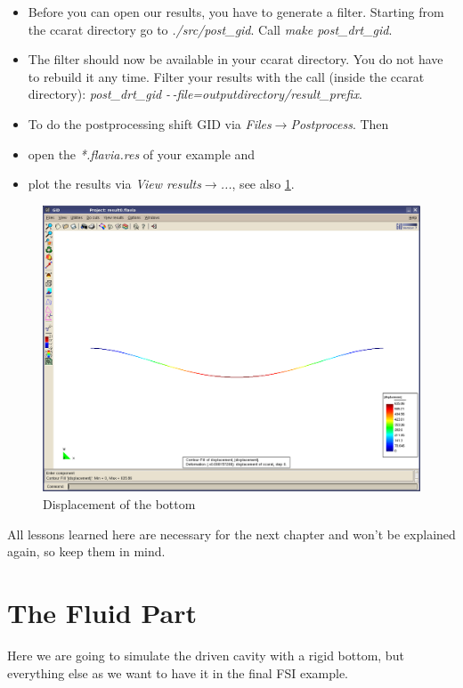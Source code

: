 \begin{itemize}
\item Before you can open our results, you have to generate a filter. Starting from the ccarat directory go to \emph{./src/post\_gid}. Call \emph{make post\_drt\_gid}.
\item The filter should now be available in your ccarat directory. You do not have to rebuild it any time. Filter your results with the call (inside the ccarat directory): \emph{post\_drt\_gid -\,-file=outputdirectory/result\_prefix}.
\item To do the postprocessing shift GID via \emph{Files$\to$Postprocess}.
Then
\item open the \emph{{*}.flavia.res} of your example and
\item plot the results via \emph{View results$\to$...}, see also \ref{tut_fsi:3.3}.
\end{itemize}
%
\begin{figure}[h]
\includegraphics[width=1\columnwidth]{Bilder/structure_03}


\caption{\label{tut_fsi:3.3} Displacement of the bottom}
\end{figure}


All lessons learned here are necessary for the next chapter and won't
be explained again, so keep them in mind.


\section{The Fluid Part}

Here we are going to simulate the driven cavity with a rigid bottom,
but everything else as we want to have it in the final FSI example.


